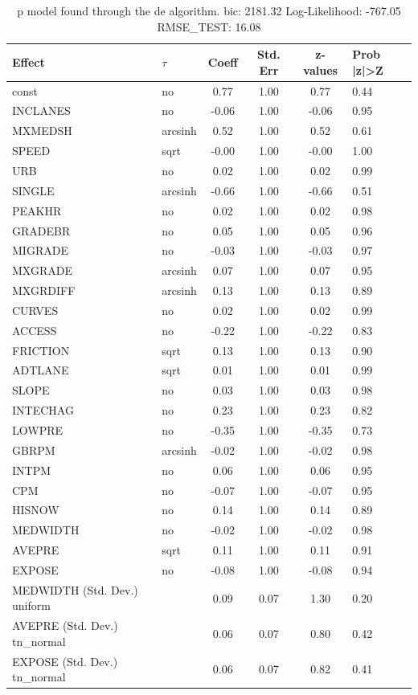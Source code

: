 \begin{table}
	\caption{p model found through the de algorithm. bic: 2181.32 Log-Likelihood: -767.05 RMSE_TEST: 16.08}
	\begin{center}
		\begin{tabular}{|l|l|c|c|c|l|}
			\hline
			Effect & $\tau$ & Coeff & Std. Err & z-values & Prob |z|>Z \\
			\hline
			const & no & 0.77 & 1.00 & 0.77 & 0.44 \\
			\hline
			INCLANES & no & -0.06 & 1.00 & -0.06 & 0.95 \\
			\hline
			MXMEDSH & arcsinh & 0.52 & 1.00 & 0.52 & 0.61 \\
			\hline
			SPEED & sqrt & -0.00 & 1.00 & -0.00 & 1.00 \\
			\hline
			URB & no & 0.02 & 1.00 & 0.02 & 0.99 \\
			\hline
			SINGLE & arcsinh & -0.66 & 1.00 & -0.66 & 0.51 \\
			\hline
			PEAKHR & no & 0.02 & 1.00 & 0.02 & 0.98 \\
			\hline
			GRADEBR & no & 0.05 & 1.00 & 0.05 & 0.96 \\
			\hline
			MIGRADE & no & -0.03 & 1.00 & -0.03 & 0.97 \\
			\hline
			MXGRADE & arcsinh & 0.07 & 1.00 & 0.07 & 0.95 \\
			\hline
			MXGRDIFF & arcsinh & 0.13 & 1.00 & 0.13 & 0.89 \\
			\hline
			CURVES & no & 0.02 & 1.00 & 0.02 & 0.99 \\
			\hline
			ACCESS & no & -0.22 & 1.00 & -0.22 & 0.83 \\
			\hline
			FRICTION & sqrt & 0.13 & 1.00 & 0.13 & 0.90 \\
			\hline
			ADTLANE & sqrt & 0.01 & 1.00 & 0.01 & 0.99 \\
			\hline
			SLOPE & no & 0.03 & 1.00 & 0.03 & 0.98 \\
			\hline
			INTECHAG & no & 0.23 & 1.00 & 0.23 & 0.82 \\
			\hline
			LOWPRE & no & -0.35 & 1.00 & -0.35 & 0.73 \\
			\hline
			GBRPM & arcsinh & -0.02 & 1.00 & -0.02 & 0.98 \\
			\hline
			INTPM & no & 0.06 & 1.00 & 0.06 & 0.95 \\
			\hline
			CPM & no & -0.07 & 1.00 & -0.07 & 0.95 \\
			\hline
			HISNOW & no & 0.14 & 1.00 & 0.14 & 0.89 \\
			\hline
			MEDWIDTH & no & -0.02 & 1.00 & -0.02 & 0.98 \\
			\hline
			AVEPRE & sqrt & 0.11 & 1.00 & 0.11 & 0.91 \\
			\hline
			EXPOSE & no & -0.08 & 1.00 & -0.08 & 0.94 \\
			\hline
			MEDWIDTH (Std. Dev.) uniform &  & 0.09 & 0.07 & 1.30 & 0.20 \\
			\hline
			AVEPRE (Std. Dev.) tn_normal &  & 0.06 & 0.07 & 0.80 & 0.42 \\
			\hline
			EXPOSE (Std. Dev.) tn_normal &  & 0.06 & 0.07 & 0.82 & 0.41 \\
			\hline
		\end{tabular}
	\end{center}
\end{table}